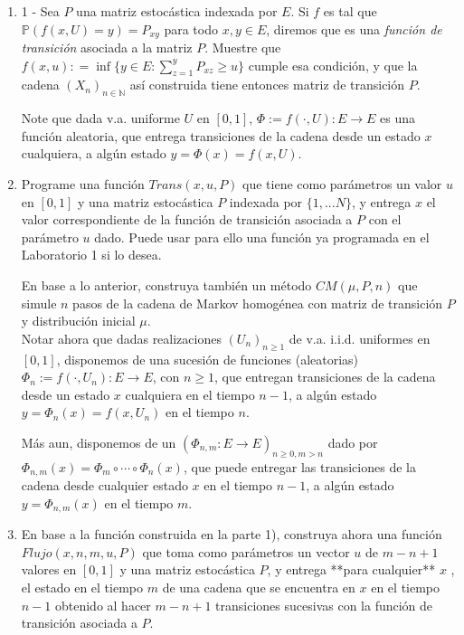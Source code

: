 \begin{enumerate}
	\item  1 - Sea $P$ una matriz estocástica  indexada por $E$. Si	$f$ es tal que $ \mathbb{P}(f(x,U)=y)= P_{xy} $ para todo $x,y\in E$, diremos que es una  \textit{función de transición} asociada a la matriz $P$. Muestre que $f(x,u): = \inf \{y\in E : \sum_{z=1}^y P_{xz}\geq u\}$ cumple esa condición, y que   la cadena $(X_n)_{n\in\mathbb{N}}$  así  construida tiene entonces matriz de transición $P$.

    Note que dada  v.a. uniforme $U$ en $[0,1]$, $\Phi:= f(\cdot,  U):E \rightarrow E$  es una función aleatoria,  que entrega transiciones de la cadena desde  un estado $x$ cualquiera, a algún estado $y=\Phi(x)= f(x,  U)$.  
				
	\item  Programe una función $Trans(x,u,P)$ que tiene  como parámetros un valor $u$  en $[0,1]$ y una matriz estocástica $P$ indexada por $\{1,...N\}$, y  entrega  $x$ el  valor correspondiente de la función de transición  asociada a $P$ con el parámetro $u$ dado.  Puede usar para ello una función ya programada en el Laboratorio 1 si lo desea.

    En base a lo anterior, construya  también  un método $CM(\mu,P,n)$ que simule $n$ pasos de la cadena de Markov homogénea con matriz de transición $P$ y distribución inicial $\mu$. 
    \vspace{.5cm}\\
    Notar ahora que  dadas realizaciones  $(U_{n})_{n\geq 1}$ de v.a.  i.i.d. uniformes en $[0,1]$,  disponemos de una sucesión  de funciones  (aleatorias) $\Phi_n:= f(\cdot,  U_n):E \rightarrow E$, con $n\geq 1$,   que entregan  transiciones de la cadena desde  un estado $x$ cualquiera en el tiempo $n-1$, a algún estado $y=\Phi_n (x)= f(x,  U_n)$  en el tiempo $n$.

    Más aun,   disponemos de un    $(\Phi_{n,m} :E \rightarrow E )_{n\geq 0, m> n} $ dado por  $ \Phi_{n,m} (x)=  \Phi_{m} \circ \cdots \circ \Phi_n(x)$,   que puede  entregar  las transiciones de la cadena desde  cualquier estado $x$  en el tiempo $n-1$, a algún estado $y=\Phi_{n,m} (x)$  en el tiempo $m$.

    \item En base a la función construida en la parte 1),   construya ahora una función  $Flujo(x,n,m,u,P)$ que toma como parámetros  un vector  $u$  de $m-n+1$  valores en $[0,1]$ y una matriz estocástica  $P$, y entrega  **para cualquier** $x$ ,  el estado  en el tiempo $m$  de una cadena que se encuentra en $x$ en el tiempo $n-1$ obtenido al hacer $m-n+1$   transiciones sucesivas con la  función de transición  asociada a $P$. 
	

\end{enumerate}

